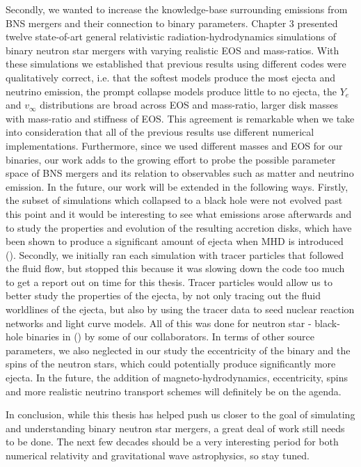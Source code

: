 Secondly, we wanted to increase the knowledge-base surrounding emissions from BNS mergers and their connection to binary parameters. Chapter 3 presented twelve state-of-art general relativistic radiation-hydrodynamics simulations of binary neutron star mergers with varying realistic EOS and mass-ratios.  With these simulations we established that previous results using different codes were qualitatively correct, i.e. that the softest models produce the most ejecta and neutrino emission, the prompt collapse models produce little to no ejecta, the $Y_e$ and $v_\infty$ distributions are broad across EOS and mass-ratio, larger disk masses with mass-ratio and stiffness of EOS. This agreement is remarkable when we take into consideration that all of the previous results use different numerical implementations. Furthermore, since we used different masses and EOS for our binaries, our work adds to the growing effort to probe the possible parameter space of BNS mergers and its relation to observables such as matter and neutrino emission.  In the future, our work will be extended in the following ways. Firstly, the subset of simulations which collapsed to a black hole were not evolved past this point and it would be interesting to see what emissions arose afterwards and to study the properties and evolution of the resulting accretion disks, which have been shown to produce a significant amount of ejecta when MHD is introduced (\cite{fernandez2019long}). Secondly, we initially ran each simulation with tracer particles that followed the fluid flow, but stopped this because it was slowing down the code too much to get a report out on time for this thesis. Tracer particles would allow us to better study the properties of the ejecta, by not only tracing out the fluid worldlines of the ejecta, but also by using the tracer data to seed nuclear reaction networks and light curve models. All of this was done for neutron star - black-hole binaries in (\cite{fernandez2016dynamics}) by some of our collaborators. In terms of other source parameters, we also neglected in our study the eccentricity of the binary and the spins of the neutron stars, which could potentially produce significantly more ejecta. In the future, the addition of magneto-hydrodynamics, eccentricity, spins and more realistic neutrino transport schemes will definitely be on the agenda.

In conclusion, while this thesis has helped push us closer to the goal of simulating and understanding binary neutron star mergers, a great deal of work still needs to be done. The next few decades should be a very interesting period for both numerical relativity and gravitational wave astrophysics, so stay tuned.

